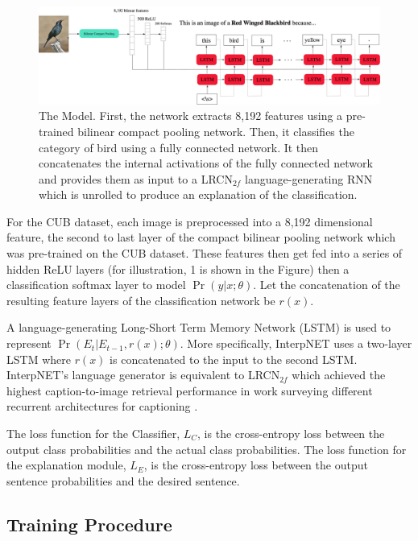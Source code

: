 \documentclass{article}
\begin{document}
\begin{figure}[h]
  \centering
  \includegraphics[width=\linewidth]{figures/model-birds}
  \caption{The Model. First, the network extracts 8,192 features using a pre-trained bilinear compact pooling network. Then, it classifies the category of bird using a fully connected network. It then concatenates the internal activations of the fully connected network and provides them as input to a LRCN$_{2f}$ language-generating RNN which is unrolled to produce an explanation of the classification.}
  \label{fig:model}
\end{figure}

For the CUB dataset, each image is preprocessed into a 8,192 dimensional feature, the second to last layer of the compact bilinear pooling network \cite{gao2016compact} which was pre-trained on the CUB dataset. These features then get fed into a series of hidden ReLU layers (for illustration, 1 is shown in the Figure) then a classification softmax layer to model $\Pr(y|x; \theta)$. Let the concatenation of the resulting feature layers of the classification network be $r(x)$.

A language-generating Long-Short Term Memory Network (LSTM) is used to represent $\Pr(E_t|E_{t-1}, r(x); \theta)$. More specifically, InterpNET uses a two-layer LSTM where $r(x)$ is concatenated to the input to the second LSTM. InterpNET's language generator is equivalent to LRCN$_{2f}$ which achieved the highest caption-to-image retrieval performance in work surveying different recurrent architectures for captioning \cite{donahue2015long}.

The loss function for the Classifier, $L_C$, is the cross-entropy loss between the output class probabilities and the actual class probabilities. The loss function for the explanation module, $L_E$, is the cross-entropy loss between the output sentence probabilities and the desired sentence.

\subsection{Training Procedure}
\end{document}
